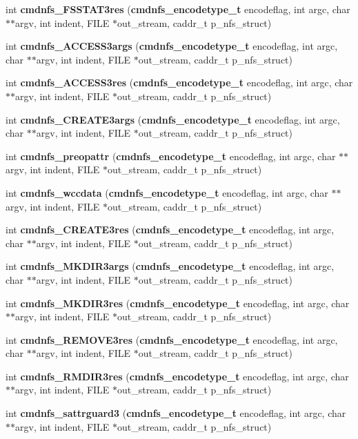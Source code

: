 \begin{CompactItemize}
\item 
int {\bf cmdnfs\_\-FSSTAT3res} ({\bf cmdnfs\_\-encodetype\_\-t} encodeflag, int argc, char $\ast$$\ast$argv, int indent, FILE $\ast$out\_\-stream, caddr\_\-t p\_\-nfs\_\-struct)
\item 
int {\bf cmdnfs\_\-ACCESS3args} ({\bf cmdnfs\_\-encodetype\_\-t} encodeflag, int argc, char $\ast$$\ast$argv, int indent, FILE $\ast$out\_\-stream, caddr\_\-t p\_\-nfs\_\-struct)
\item 
int {\bf cmdnfs\_\-ACCESS3res} ({\bf cmdnfs\_\-encodetype\_\-t} encodeflag, int argc, char $\ast$$\ast$argv, int indent, FILE $\ast$out\_\-stream, caddr\_\-t p\_\-nfs\_\-struct)
\item 
int {\bf cmdnfs\_\-CREATE3args} ({\bf cmdnfs\_\-encodetype\_\-t} encodeflag, int argc, char $\ast$$\ast$argv, int indent, FILE $\ast$out\_\-stream, caddr\_\-t p\_\-nfs\_\-struct)
\item 
int {\bf cmdnfs\_\-preopattr} ({\bf cmdnfs\_\-encodetype\_\-t} encodeflag, int argc, char $\ast$$\ast$argv, int indent, FILE $\ast$out\_\-stream, caddr\_\-t p\_\-nfs\_\-struct)
\item 
int {\bf cmdnfs\_\-wccdata} ({\bf cmdnfs\_\-encodetype\_\-t} encodeflag, int argc, char $\ast$$\ast$argv, int indent, FILE $\ast$out\_\-stream, caddr\_\-t p\_\-nfs\_\-struct)
\item 
int {\bf cmdnfs\_\-CREATE3res} ({\bf cmdnfs\_\-encodetype\_\-t} encodeflag, int argc, char $\ast$$\ast$argv, int indent, FILE $\ast$out\_\-stream, caddr\_\-t p\_\-nfs\_\-struct)
\item 
int {\bf cmdnfs\_\-MKDIR3args} ({\bf cmdnfs\_\-encodetype\_\-t} encodeflag, int argc, char $\ast$$\ast$argv, int indent, FILE $\ast$out\_\-stream, caddr\_\-t p\_\-nfs\_\-struct)
\item 
int {\bf cmdnfs\_\-MKDIR3res} ({\bf cmdnfs\_\-encodetype\_\-t} encodeflag, int argc, char $\ast$$\ast$argv, int indent, FILE $\ast$out\_\-stream, caddr\_\-t p\_\-nfs\_\-struct)
\item 
int {\bf cmdnfs\_\-REMOVE3res} ({\bf cmdnfs\_\-encodetype\_\-t} encodeflag, int argc, char $\ast$$\ast$argv, int indent, FILE $\ast$out\_\-stream, caddr\_\-t p\_\-nfs\_\-struct)
\item 
int {\bf cmdnfs\_\-RMDIR3res} ({\bf cmdnfs\_\-encodetype\_\-t} encodeflag, int argc, char $\ast$$\ast$argv, int indent, FILE $\ast$out\_\-stream, caddr\_\-t p\_\-nfs\_\-struct)
\item 
int {\bf cmdnfs\_\-sattrguard3} ({\bf cmdnfs\_\-encodetype\_\-t} encodeflag, int argc, char $\ast$$\ast$argv, int indent, FILE $\ast$out\_\-stream, caddr\_\-t p\_\-nfs\_\-struct)

\end{CompactItemize}
